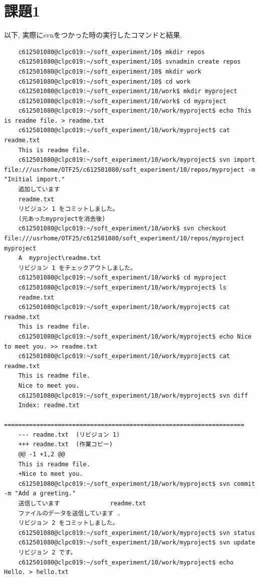 \documentclass[dvipdfmx]{jsarticle}
\begin{document}
\section{課題1}
%
以下, 実際にsvnをつかった時の実行したコマンドと結果.\\
\begin{verbatim}
    c612501080@clpc019:~/soft_experiment/10$ mkdir repos
    c612501080@clpc019:~/soft_experiment/10$ svnadmin create repos
    c612501080@clpc019:~/soft_experiment/10$ mkdir work
    c612501080@clpc019:~/soft_experiment/10$ cd work
    c612501080@clpc019:~/soft_experiment/10/work$ mkdir myproject
    c612501080@clpc019:~/soft_experiment/10/work$ cd myproject
    c612501080@clpc019:~/soft_experiment/10/work/myproject$ echo This is readme file. > readme.txt
    c612501080@clpc019:~/soft_experiment/10/work/myproject$ cat readme.txt 
    This is readme file.
    c612501080@clpc019:~/soft_experiment/10/work/myproject$ svn import file:///usrhome/OTF25/c612501080/soft_experiment/10/repos/myproject -m "Initial import."
    追加しています              
    readme.txt
    リビジョン 1 をコミットしました。
    (元あったmyprojectを消去後)
    c612501080@clpc019:~/soft_experiment/10/work$ svn checkout file:///usrhome/OTF25/c612501080/soft_experiment/10/repos/myproject myproject
    A  myproject\readme.txt
    リビジョン 1 をチェックアウトしました。
    c612501080@clpc019:~/soft_experiment/10/work$ cd myproject
    c612501080@clpc019:~/soft_experiment/10/work/myproject$ ls
    readme.txt
    c612501080@clpc019:~/soft_experiment/10/work/myproject$ cat readme.txt
    This is readme file.
    c612501080@clpc019:~/soft_experiment/10/work/myproject$ echo Nice to meet you. >> readme.txt
    c612501080@clpc019:~/soft_experiment/10/work/myproject$ cat readme.txt
    This is readme file.
    Nice to meet you.
    c612501080@clpc019:~/soft_experiment/10/work/myproject$ svn diff
    Index: readme.txt
    ===================================================================
    --- readme.txt  (リビジョン 1)
    +++ readme.txt  (作業コピー)
    @@ -1 +1,2 @@
    This is readme file.
    +Nice to meet you.
    c612501080@clpc019:~/soft_experiment/10/work/myproject$ svn commit -m "Add a greeting."
    送信しています              readme.txt
    ファイルのデータを送信しています .
    リビジョン 2 をコミットしました。
    c612501080@clpc019:~/soft_experiment/10/work/myproject$ svn status
    c612501080@clpc019:~/soft_experiment/10/work/myproject$ svn update
    リビジョン 2 です。
    c612501080@clpc019:~/soft_experiment/10/work/myproject$ echo Hello. > hello.txt

\end{verbatim}
\end{document}
